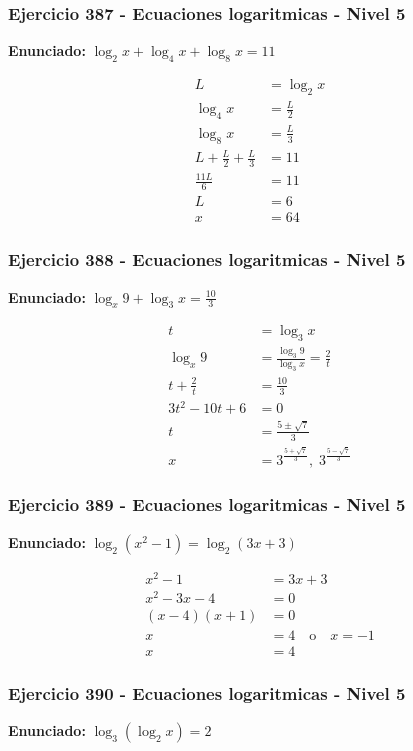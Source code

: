 \documentclass[12pt,a4paper]{article}
\begin{document}
\subsubsection*{Ejercicio 387 - Ecuaciones logaritmicas - Nivel 5}
\textbf{Enunciado:} \(\log_2x+\log_4x+\log_8x=11\)

\[
\begin{aligned}
L&=\log_2x\\
\log_4x&=\frac L2\\
\log_8x&=\frac L3\\
L+\frac L2+\frac L3&=11\\
\frac{11L}{6}&=11\\
L&=6\\
x&=\boxed{64}
\end{aligned}
\]


\subsubsection*{Ejercicio 388 - Ecuaciones logaritmicas - Nivel 5}
\textbf{Enunciado:} \(\log_x9+\log_3x=\frac{10}{3}\)

\[
\begin{aligned}
t&=\log_3x\\
\log_x9&=\frac{\log_3 9}{\log_3x}=\frac2t\\
t+\frac2t&=\frac{10}{3}\\
3t^2-10t+6&=0\\
t&=\frac{5\pm\sqrt7}{3}\\
x&=\boxed{3^{\frac{5+\sqrt7}{3}},\;3^{\frac{5-\sqrt7}{3}}}
\end{aligned}
\]


\subsubsection*{Ejercicio 389 - Ecuaciones logaritmicas - Nivel 5}
\textbf{Enunciado:} \(\log_2(x^2-1)=\log_2(3x+3)\)

\[
\begin{aligned}
x^2-1&=3x+3\\
x^2-3x-4&=0\\
(x-4)(x+1)&=0\\
x&=4\quad \text{o}\quad x=-1\\
x&=\boxed{4}
\end{aligned}
\]


\subsubsection*{Ejercicio 390 - Ecuaciones logaritmicas - Nivel 5}
\textbf{Enunciado:} \(\log_3(\log_2 x)=2\)
\end{document}
